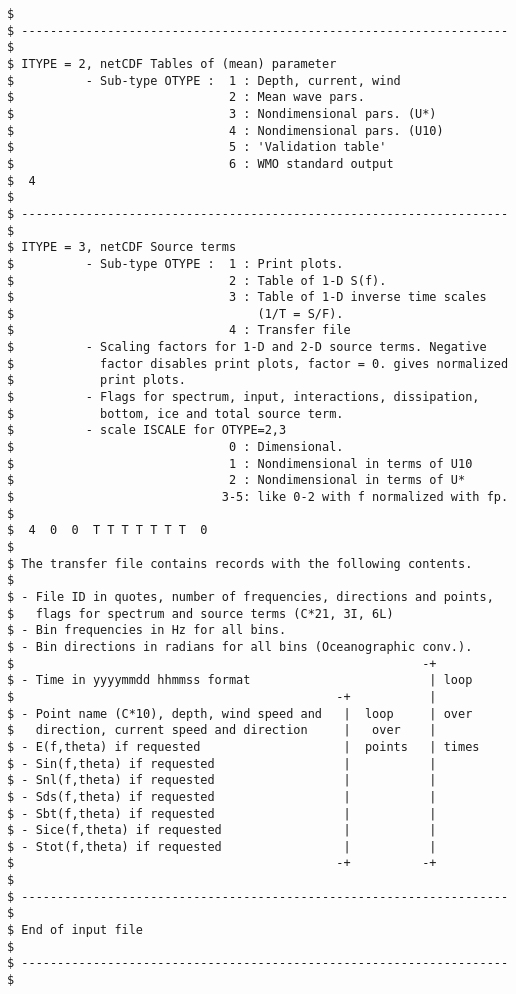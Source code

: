 \begin{footnotesize}
\begin{verbatim}
$
$ -------------------------------------------------------------------- $
$ ITYPE = 2, netCDF Tables of (mean) parameter
$          - Sub-type OTYPE :  1 : Depth, current, wind
$                              2 : Mean wave pars.
$                              3 : Nondimensional pars. (U*)
$                              4 : Nondimensional pars. (U10)
$                              5 : 'Validation table'
$                              6 : WMO standard output 
$  4
$
$ -------------------------------------------------------------------- $
$ ITYPE = 3, netCDF Source terms
$          - Sub-type OTYPE :  1 : Print plots.
$                              2 : Table of 1-D S(f).
$                              3 : Table of 1-D inverse time scales
$                                  (1/T = S/F).
$                              4 : Transfer file
$          - Scaling factors for 1-D and 2-D source terms. Negative
$            factor disables print plots, factor = 0. gives normalized
$            print plots.
$          - Flags for spectrum, input, interactions, dissipation,
$            bottom, ice and total source term.
$          - scale ISCALE for OTYPE=2,3
$                              0 : Dimensional.
$                              1 : Nondimensional in terms of U10
$                              2 : Nondimensional in terms of U*
$                             3-5: like 0-2 with f normalized with fp.
$
$  4  0  0  T T T T T T T  0
$
$ The transfer file contains records with the following contents.
$
$ - File ID in quotes, number of frequencies, directions and points,
$   flags for spectrum and source terms (C*21, 3I, 6L)
$ - Bin frequencies in Hz for all bins.
$ - Bin directions in radians for all bins (Oceanographic conv.).
$                                                         -+
$ - Time in yyyymmdd hhmmss format                         | loop
$                                             -+           |
$ - Point name (C*10), depth, wind speed and   |  loop     | over
$   direction, current speed and direction     |   over    |
$ - E(f,theta) if requested                    |  points   | times
$ - Sin(f,theta) if requested                  |           |
$ - Snl(f,theta) if requested                  |           |
$ - Sds(f,theta) if requested                  |           |
$ - Sbt(f,theta) if requested                  |           |
$ - Sice(f,theta) if requested                 |           |
$ - Stot(f,theta) if requested                 |           |
$                                             -+          -+
$
$ -------------------------------------------------------------------- $
$ End of input file                                                    $
$ -------------------------------------------------------------------- $
\end{verbatim}
\end{footnotesize}
